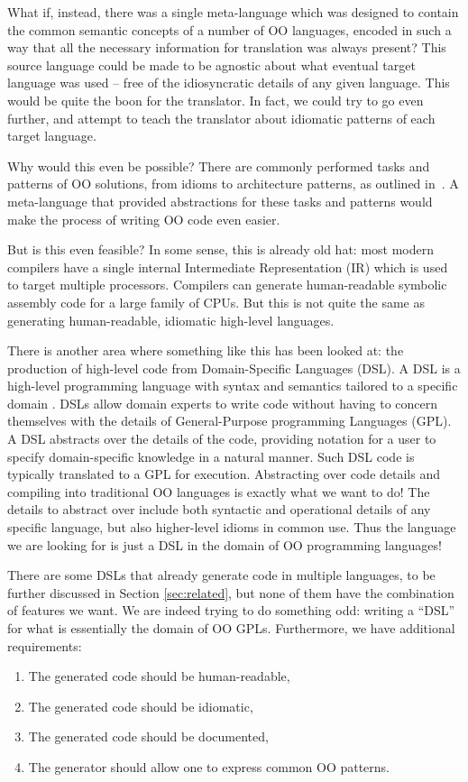 \documentclass[sigplan,review,anonymous,prologue,dvipsnames]{acmart}
\begin{document}
What if, instead, there was a single meta-language which was designed to
contain the common semantic concepts of a number of OO languages, encoded
in such a way that all the necessary information for translation was always
present?  This source language could be made to be agnostic about what
eventual target language was used -- free of the idiosyncratic details of
any given language.  This would be quite the boon for the translator.
In fact, we could try to go even further, and attempt to teach the translator
about idiomatic patterns of each target language.

Why would this even be possible? There are commonly performed tasks and
patterns of OO solutions, from idioms to architecture patterns, as outlined
in~\cite{gamma1995design}. A meta-language
that provided abstractions for these tasks and patterns would make the process
of writing OO code even easier.

But is this even feasible? In some sense, this is already old hat: most
modern compilers have a single internal Intermediate Representation (IR)
which is used to target multiple processors. Compilers can generate
human-readable symbolic assembly code for a large family of CPUs. But this
is not quite the same as generating human-readable, idiomatic high-level
languages.

There is another area where something like this has been looked at:
the production of high-level code from Domain-Specific Languages (DSL).
A DSL is a high-level programming language with syntax and semantics tailored
to a specific domain \cite{mernik2005and}. DSLs allow domain experts
to write code without having to concern themselves with the details of
General-Purpose programming Languages (GPL). A DSL
abstracts over the details of the code, providing notation for a user to
specify domain-specific knowledge in a natural manner. Such DSL code is typically
translated to a GPL for execution. Abstracting over code details
and compiling into traditional OO languages is exactly what we want to do!
The details to abstract over include both syntactic and operational details of
any specific language, but also higher-level idioms in common use.  Thus
the language we are looking for
is just a DSL in the domain of OO programming languages!

There are some DSLs that already generate code in multiple languages, to be
further discussed in Section \ref{sec:related}, but none of them have the
combination of features we want. We are indeed trying to do something odd:
writing a ``DSL'' for what is essentially the domain of OO GPLs. Furthermore,
we have additional requirements:
\begin{enumerate}
\item The generated code should be human-readable,
\item The generated code should be idiomatic,
\item The generated code should be documented,
\item The generator should allow one to express common OO patterns.
\end{enumerate}
\end{document}
